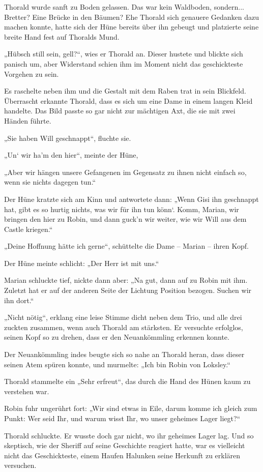 Thorald wurde sanft zu Boden gelassen. Das war kein Waldboden, sondern... Bretter? Eine Brücke in den Bäumen? Ehe Thorald sich genauere Gedanken dazu machen konnte, hatte sich der Hüne bereits über ihn gebeugt und platzierte seine breite Hand fest auf Thoralds Mund.

„Hübsch still sein, gell?“, wies er Thorald an. Dieser hustete und blickte sich panisch um, aber Widerstand schien ihm im Moment nicht das geschickteste Vorgehen zu sein.

Es raschelte neben ihm und die Gestalt mit dem Raben trat in sein Blickfeld. Überrascht erkannte Thorald, dass es sich um eine Dame in einem langen Kleid handelte. Das Bild passte so gar nicht zur mächtigen Axt, die sie mit zwei Händen führte.

„Sie haben Will geschnappt“, fluchte sie.

„Un‘ wir ha’m den hier“, meinte der Hüne,

„Aber wir hängen unsere Gefangenen im Gegensatz zu ihnen nicht einfach so, wenn sie nichts dagegen tun.“

Der Hüne kratzte sich am Kinn und antwortete dann: „Wenn Gisi ihn geschnappt hat, gibt es so hurtig nichts, was wir für ihn tun könn‘. Komm, Marian, wir bringen den hier zu Robin, und dann guck’n wir weiter, wie wir Will aus dem Castle kriegen.“

„Deine Hoffnung hätte ich gerne“, schüttelte die Dame – Marian – ihren Kopf.

Der Hüne meinte schlicht: „Der Herr ist mit uns.“

Marian schluckte tief, nickte dann aber: „Na gut, dann auf zu Robin mit ihm. Zuletzt hat er auf der anderen Seite der Lichtung Position bezogen. Suchen wir ihn dort.“

„Nicht nötig“, erklang eine leise Stimme dicht neben dem Trio, und alle drei zuckten zusammen, wenn auch Thorald am stärksten. Er versuchte erfolglos, seinen Kopf so zu drehen, dass er den Neuankömmling erkennen konnte.

Der Neuankömmling indes beugte sich so nahe an Thorald heran, dass dieser seinen Atem spüren konnte, und murmelte: „Ich bin Robin von Loksley.“

Thorald stammelte ein „Sehr erfreut“, das durch die Hand des Hünen kaum zu verstehen war.

Robin fuhr ungerührt fort: „Wir sind etwas in Eile, darum komme ich gleich zum Punkt: Wer seid Ihr, und warum wisst Ihr, wo unser geheimes Lager liegt?“

Thorald schluckte. Er wusste doch gar nicht, wo ihr geheimes Lager lag. Und so skeptisch, wie der Sheriff auf seine Geschichte reagiert hatte, war es vielleicht nicht das Geschickteste, einem Haufen Halunken seine Herkunft zu erklären versuchen.

